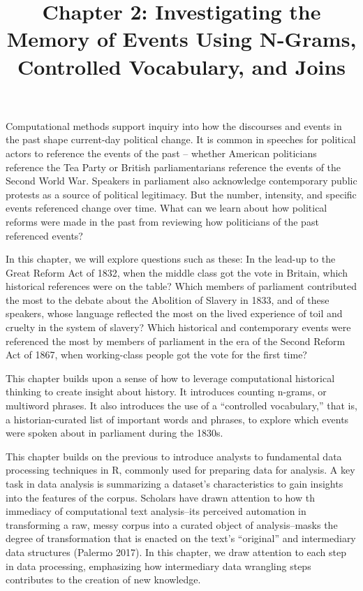 \documentclass[
]{article}
\title{Chapter 2: Investigating the Memory of Events Using N-Grams,
Controlled Vocabulary, and Joins}
\author{}
\date{\vspace{-2.5em}}
\newcounter{chapter}
\begin{document}
\maketitle

Computational methods support inquiry into how the discourses and events
in the past shape current-day political change. It is common in speeches
for political actors to reference the events of the past -- whether
American politicians reference the Tea Party or British parliamentarians
reference the events of the Second World War. Speakers in parliament
also acknowledge contemporary public protests as a source of political
legitimacy. But the number, intensity, and specific events referenced
change over time. What can we learn about how political reforms were
made in the past from reviewing how politicians of the past referenced
events?

In this chapter, we will explore questions such as these: In the lead-up
to the Great Reform Act of 1832, when the middle class got the vote in
Britain, which historical references were on the table? Which members of
parliament contributed the most to the debate about the Abolition of
Slavery in 1833, and of these speakers, whose language reflected the
most on the lived experience of toil and cruelty in the system of
slavery? Which historical and contemporary events were referenced the
most by members of parliament in the era of the Second Reform Act of
1867, when working-class people got the vote for the first time?

This chapter builds upon a sense of how to leverage computational
historical thinking to create insight about history. It introduces
counting n-grams, or multiword phrases. It also introduces the use of a
``controlled vocabulary,'' that is, a historian-curated list of
important words and phrases, to explore which events were spoken about
in parliament during the 1830s.

This chapter builds on the previous to introduce analysts to fundamental
data processing techniques in R, commonly used for preparing data for
analysis. A key task in data analysis is summarizing a dataset's
characteristics to gain insights into the features of the corpus.
Scholars have drawn attention to how th immediacy of computational text
analysis--its perceived automation in transforming a raw, messy corpus
into a curated object of analysis--masks the degree of transformation
that is enacted on the text's ``original'' and intermediary data
structures (Palermo 2017). In this chapter, we draw attention to each
step in data processing, emphasizing how intermediary data wrangling
steps contributes to the creation of new knowledge.
\end{document}
